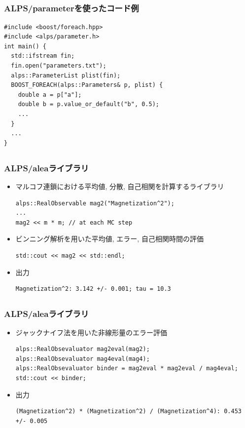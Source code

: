 \subsection*{\redm\whitem\greenb}
\begin{frame}[t,fragile]
  \frametitle{ALPS/parameterを使ったコード例}
  \begin{lstlisting}
#include <boost/foreach.hpp>
#include <alps/parameter.h>
int main() {
  std::ifstream fin;
  fin.open("parameters.txt");
  alps::ParameterList plist(fin);
  BOOST_FOREACH(alps::Parameters& p, plist) {
    double a = p["a"];
    double b = p.value_or_default("b", 0.5);
    ...
  }
  ...
}
\end{lstlisting}
\end{frame}

\subsection*{\redm\whitem\greenb}
\begin{frame}[t,fragile]
  \frametitle{ALPS/aleaライブラリ}
  \begin{itemize}
  \item マルコフ連鎖における平均値, 分散, 自己相関を計算するライブラリ
    \begin{lstlisting}
alps::RealObservable mag2("Magnetization^2");
...
mag2 << m * m; // at each MC step
\end{lstlisting}
  \item ビンニング解析を用いた平均値, エラー, 自己相関時間の評価
    \begin{lstlisting}
std::cout << mag2 << std::endl;
\end{lstlisting}
  \item 出力
\begin{lstlisting}
Magnetization^2: 3.142 +/- 0.001; tau = 10.3
\end{lstlisting}
  \end{itemize}
\end{frame}

\subsection*{\redm\whitem\greenb}
\begin{frame}[t,fragile]
  \frametitle{ALPS/aleaライブラリ}
  \begin{itemize}
  \item ジャックナイフ法を用いた非線形量のエラー評価
    \begin{lstlisting}
alps::RealObsevaluator mag2eval(mag2);
alps::RealObsevaluator mag4eval(mag4);
alps::RealObsevaluator binder = mag2eval * mag2eval / mag4eval;
std::cout << binder;
\end{lstlisting}
  \item 出力
\begin{lstlisting}
(Magnetization^2) * (Magnetization^2) / (Magnetization^4): 0.453 +/- 0.005
\end{lstlisting}
  \end{itemize}
\end{frame}


